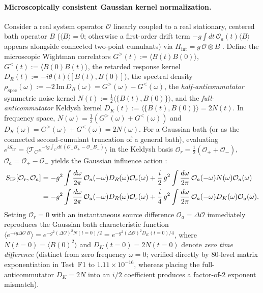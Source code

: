 \documentclass[11pt,a4paper]{article}
\theoremstyle{definition}
\theoremstyle{remark}
\newcommand{\1}{\mathbf{1}}
\begin{document}
\paragraph{Microscopically consistent Gaussian kernel normalization.}
Consider a real system operator $\mathcal{O}$ linearly coupled to a real stationary, centered bath operator $B$ ($\langle B\rangle = 0$; otherwise a first-order drift term $-g\int dt\,\mathcal{O}_a(t)\langle B\rangle$ appears alongside connected two-point cumulants) via $H_{\mathrm{int}} = g\,\mathcal{O}\otimes B$ \cite{FeynmanVernon1963,WuLee2005}. Define the microscopic Wightman correlators $G^>(t) := \langle B(t)B(0)\rangle$, $G^<(t) := \langle B(0)B(t)\rangle$, the retarded response kernel $D_R(t) := -i\theta(t)\langle [B(t), B(0)]\rangle$, the spectral density $\rho_{\mathrm{spec}}(\omega) := -2\,\mathrm{Im}\,D_R(\omega) = G^>(\omega) - G^<(\omega)$, the \emph{half-anticommutator} symmetric noise kernel $N(t) := \frac{1}{2}\langle\{B(t),B(0)\}\rangle$, and the \emph{full-anticommutator} Keldysh kernel $D_K(t) := \langle\{B(t),B(0)\}\rangle = 2 N(t)$. In frequency space, $N(\omega) = \frac{1}{2}(G^>(\omega)+G^<(\omega))$ and $D_K(\omega) = G^>(\omega)+G^<(\omega) = 2 N(\omega)$. For a Gaussian bath (or as the connected second-cumulant truncation of a general bath), evaluating $e^{i S_{\mathrm{IF}}} = \langle \mathcal{T}_C e^{-i g \int_C dt\,(\mathcal{O}_+ B_+ - \mathcal{O}_- B_-)}\rangle$ in the Keldysh basis $\mathcal{O}_r = \frac{1}{2}(\mathcal{O}_+ + \mathcal{O}_-)$, $\mathcal{O}_a = \mathcal{O}_+ - \mathcal{O}_-$ yields the Gaussian influence action \cite{WuLee2005}:
\begin{align}
  S_{\mathrm{IF}}[\mathcal{O}_r, \mathcal{O}_a]
  &= -g^2 \int \frac{d\omega}{2\pi}\,\mathcal{O}_a(-\omega) D_R(\omega) \mathcal{O}_r(\omega)
     + \frac{i}{2}\,g^2 \int \frac{d\omega}{2\pi}\,\mathcal{O}_a(-\omega) N(\omega) \mathcal{O}_a(\omega) \notag\\
  &= -g^2 \int \frac{d\omega}{2\pi}\,\mathcal{O}_a(-\omega) D_R(\omega) \mathcal{O}_r(\omega)
     + \frac{i}{4}\,g^2 \int \frac{d\omega}{2\pi}\,\mathcal{O}_a(-\omega) D_K(\omega) \mathcal{O}_a(\omega). \label{eq:fv-quad}
\end{align}
Setting $\mathcal{O}_r = 0$ with an instantaneous source difference $\mathcal{O}_a = \Delta\mathcal{O}$ immediately reproduces the Gaussian bath characteristic function $\langle e^{-i g\Delta\mathcal{O}\,B}\rangle = e^{-g^2(\Delta\mathcal{O})^2 N(t=0)/2} = e^{-g^2(\Delta\mathcal{O})^2 D_K(t=0)/4}$, where $N(t=0)=\langle B(0)^2\rangle$ and $D_K(t=0)=2N(t=0)$ denote \emph{zero time difference} (distinct from zero frequency $\omega=0$; verified directly by 80-level matrix exponentiation in Test~F1 to $1.11\times 10^{-16}$, whereas placing the full-anticommutator $D_K = 2N$ into an $i/2$ coefficient produces a factor-of-2 exponent mismatch).
\end{document}
